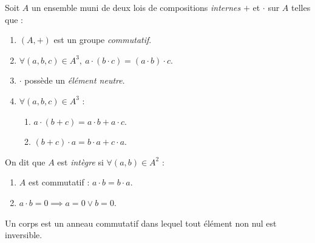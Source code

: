 \begin{definition}[Anneau]
	Soit $A$ un ensemble muni de deux lois de compositions \emph{internes} \og $+$ \fg et \og $\cdot$ \fg sur $A$ telles que : 
	\begin{enumerate}
		\item $(A, +)$ est un groupe \emph{commutatif}.
		\item $\forall (a, b, c) \in A^3,\ a \cdot (b \cdot c) = (a \cdot b) \cdot c$.
		\item \og $\cdot$ \fg possède un \emph{élément neutre}.
		\item $\forall (a, b, c ) \in A^3$ : 
		\begin{enumerate}
			\item $a \cdot (b + c) = a \cdot b + a \cdot c$.
			\item $(b + c) \cdot a = b \cdot a + c \cdot a$.
		\end{enumerate}
	\end{enumerate}
	On dit que $A$ est \emph{intègre} si $\forall (a, b) \in A^2$ :
	\begin{enumerate}
		\item $A$ est commutatif : $a \cdot b = b \cdot a$.
		\item $a \cdot b = 0 \implies a = 0 \lor b = 0$.
	\end{enumerate}
\end{definition}

\begin{definition}[Corps]
    Un corps est un anneau commutatif dans lequel tout élément non nul est inversible.
\end{definition}

